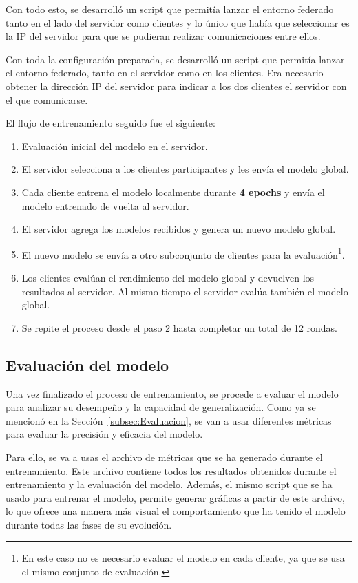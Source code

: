 Con todo esto, se desarrolló un script que permitía lanzar el entorno federado tanto en el lado del servidor como clientes y lo único que había que seleccionar es la IP del servidor para que se pudieran realizar comunicaciones entre ellos.

Con toda la configuración preparada, se desarrolló un script que permitía lanzar el entorno federado, tanto en el servidor como en los clientes. Era necesario obtener la dirección IP del servidor para indicar a los dos clientes el servidor con el que comunicarse.

El flujo de entrenamiento seguido fue el siguiente:
\begin{enumerate}
    \item Evaluación inicial del modelo en el servidor.
    \item El servidor selecciona a los clientes participantes y les envía el modelo global.
    \item Cada cliente entrena el modelo localmente durante \textbf{4 epochs} y envía el modelo entrenado de vuelta al servidor.
    \item El servidor agrega los modelos recibidos y genera un nuevo modelo global.
    \item El nuevo modelo se envía a otro subconjunto de clientes para la evaluación\footnote{En este caso no es necesario evaluar el modelo en cada cliente, ya que se usa el mismo conjunto de evaluación.}.
    \item Los clientes evalúan el rendimiento del modelo global y devuelven los resultados al servidor. Al mismo tiempo el servidor evalúa también el modelo global.
    \item Se repite el proceso desde el paso 2 hasta completar un total de 12 rondas.
\end{enumerate}


\subsection{Evaluación del modelo}
\label{subsec:EvaluacionModelo}
Una vez finalizado el proceso de entrenamiento, se procede a evaluar el modelo para analizar su desempeño y la capacidad de generalización. Como ya se mencionó en la Sección~\ref{subsec:Evaluacion}, se van a usar diferentes métricas para evaluar la precisión y eficacia del modelo.

Para ello, se va a usas el archivo de métricas que se ha generado durante el entrenamiento. Este archivo contiene todos los resultados obtenidos durante el entrenamiento y la evaluación del modelo. Además, el mismo script que se ha usado para entrenar el modelo, permite generar gráficas a partir de este archivo, lo que ofrece una manera más visual el comportamiento que ha tenido el modelo durante todas las fases de su evolución.

